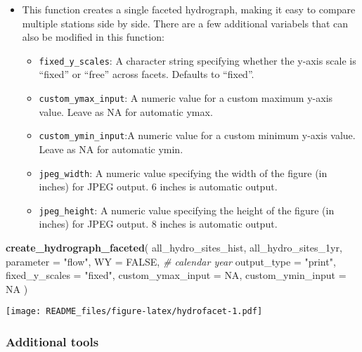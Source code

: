\documentclass[
]{article}
\newenvironment{Shaded}{\begin{snugshade}}{\end{snugshade}}
\newcommand{\AttributeTok}[1]{\textcolor[rgb]{0.13,0.29,0.53}{#1}}
\newcommand{\CommentTok}[1]{\textcolor[rgb]{0.56,0.35,0.01}{\textit{#1}}}
\newcommand{\ConstantTok}[1]{\textcolor[rgb]{0.56,0.35,0.01}{#1}}
\newcommand{\FunctionTok}[1]{\textcolor[rgb]{0.13,0.29,0.53}{\textbf{#1}}}
\newcommand{\NormalTok}[1]{#1}
\newcommand{\StringTok}[1]{\textcolor[rgb]{0.31,0.60,0.02}{#1}}
\providecommand{\tightlist}{%
  \setlength{\itemsep}{0pt}\setlength{\parskip}{0pt}}
\begin{document}
\begin{itemize}
\item
  This function creates a single faceted hydrograph, making it easy to
  compare multiple stations side by side. There are a few additional
  variabels that can also be modified in this function:

  \begin{itemize}
  \tightlist
  \item
    \texttt{fixed\_y\_scales}: A character string specifying whether the
    y-axis scale is ``fixed'' or ``free'' across facets. Defaults to
    ``fixed''.
  \item
    \texttt{custom\_ymax\_input}: A numeric value for a custom maximum
    y-axis value. Leave as NA for automatic ymax.
  \item
    \texttt{custom\_ymin\_input}:A numeric value for a custom minimum
    y-axis value. Leave as NA for automatic ymin.
  \item
    \texttt{jpeg\_width}: A numeric value specifying the width of the
    figure (in inches) for JPEG output. 6 inches is automatic output.\\
  \item
    \texttt{jpeg\_height}: A numeric value specifying the height of the
    figure (in inches) for JPEG output. 8 inches is automatic output.
  \end{itemize}
\end{itemize}

\begin{Shaded}
\begin{Highlighting}[]

\FunctionTok{create\_hydrograph\_faceted}\NormalTok{(}
\NormalTok{  all\_hydro\_sites\_hist,}
\NormalTok{  all\_hydro\_sites\_1yr,}
  \AttributeTok{parameter =} \StringTok{"flow"}\NormalTok{,}
  \AttributeTok{WY =} \ConstantTok{FALSE}\NormalTok{, }\CommentTok{\# calendar year}
  \AttributeTok{output\_type =} \StringTok{"print"}\NormalTok{, }
  \AttributeTok{fixed\_y\_scales =} \StringTok{"fixed"}\NormalTok{,}
  \AttributeTok{custom\_ymax\_input =} \ConstantTok{NA}\NormalTok{, }
  \AttributeTok{custom\_ymin\_input =} \ConstantTok{NA}
\NormalTok{)}
\end{Highlighting}
\end{Shaded}

\texttt{[image: README\_files/figure-latex/hydrofacet-1.pdf]}

\hypertarget{additional-tools}{%
\subsubsection{Additional tools}\label{additional-tools}}
\end{document}
